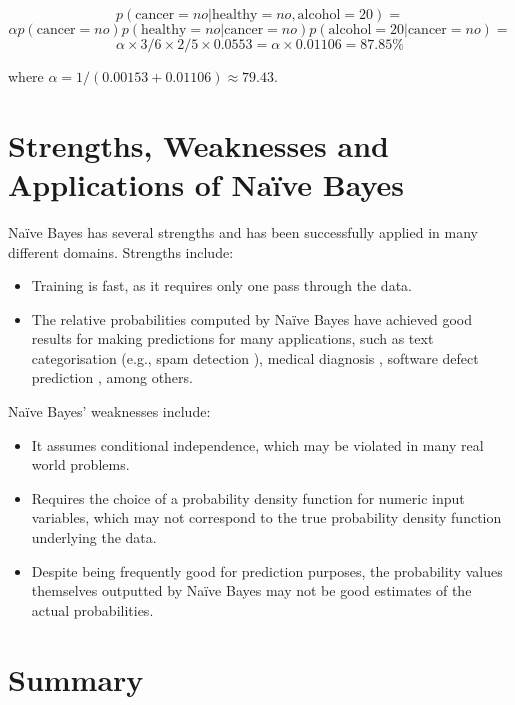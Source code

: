 \vspace{0.5cm}
\[ p(\text{cancer} = \textit{no} | \text{healthy} = \textit{no}, \text{alcohol} = 20) = \]
\[ \alpha p(\text{cancer} = \textit{no}) p(\text{healthy} = \textit{no} | \text{cancer} = \textit{no}) p(\text{alcohol} = 20 | \text{cancer} = \textit{no}) = \]
\[ \alpha \times 3/6 \times 2/5 \times 0.0553 = \alpha \times 0.01106 = 87.85\%\]

\vspace{0.5cm}
\noindent where $\alpha = 1 / (0.00153 + 0.01106) \approx 79.43$.

\section{Strengths, Weaknesses and Applications of Na\"{i}ve Bayes}

Na\"{i}ve Bayes has several strengths and has been successfully applied in many different domains. Strengths include:
\begin{itemize}
\item Training is fast, as it requires only one pass through the data.
\item The relative probabilities computed by Na\"{i}ve Bayes have achieved good results for making predictions for many applications, such as text categorisation (e.g., spam detection \cite{Spam}), medical diagnosis \cite{MedicalDiagnosis}, software defect prediction \cite{SDP}, among others.
\end{itemize}

\noindent Na\"{i}ve Bayes' weaknesses include:
\begin{itemize}
\item It assumes conditional independence, which may be violated in many real world problems. 
\item Requires the choice of a probability density function for numeric input variables, which may not correspond to the true probability density function underlying the data.
\item Despite being frequently good for prediction purposes, the probability values themselves outputted by Na\"ive Bayes may not be good estimates of the actual probabilities.
\end{itemize}

\section{Summary}

